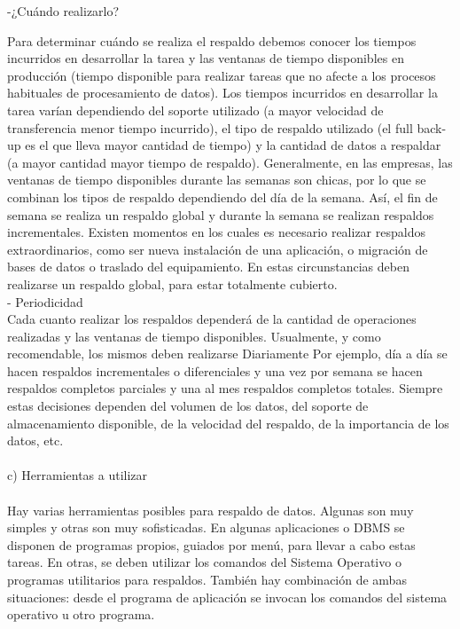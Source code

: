 \documentclass[12pt,letterpaper]{article}
\begin{document}
\newpage

-¿Cuándo realizarlo? 

Para determinar cuándo se realiza el respaldo debemos conocer los tiempos incurridos en desarrollar la tarea y las ventanas de tiempo disponibles en producción (tiempo disponible para realizar tareas que no afecte a los procesos habituales de procesamiento de datos). Los tiempos incurridos en desarrollar la tarea varían dependiendo del soporte utilizado (a mayor velocidad de transferencia menor tiempo incurrido), el tipo de respaldo utilizado (el full back-up es el que lleva mayor cantidad de tiempo) y la cantidad de datos a respaldar (a mayor cantidad mayor tiempo de respaldo). 
Generalmente, en las empresas, las ventanas de tiempo disponibles durante las semanas son chicas, por lo que se combinan los tipos de respaldo  dependiendo del día de la semana. Así, el fin de semana se realiza un respaldo global y durante la semana se realizan respaldos incrementales. Existen momentos en los cuales es necesario realizar respaldos extraordinarios, como ser nueva instalación de una aplicación, o migración de bases de datos o traslado del equipamiento. En estas circunstancias deben realizarse un respaldo global, para estar totalmente cubierto. \\

- Periodicidad \\
 
Cada cuanto realizar los respaldos dependerá de la cantidad de operaciones realizadas y las ventanas de tiempo disponibles. Usualmente, y como recomendable, los mismos deben realizarse Diariamente Por ejemplo, día a día se hacen respaldos incrementales o diferenciales y una vez por semana se hacen respaldos completos parciales y una al mes respaldos completos totales. Siempre estas decisiones dependen del volumen de los datos, del soporte de almacenamiento disponible, de la velocidad del respaldo, de la importancia de los datos, etc. \\ \\



c) Herramientas a utilizar  \\ \\
Hay varias herramientas posibles para respaldo de datos. Algunas son muy simples y otras son muy sofisticadas. En algunas aplicaciones o DBMS se disponen de programas propios, guiados por menú, para llevar a cabo estas tareas. En otras, se deben utilizar los comandos del Sistema Operativo o programas utilitarios para respaldos. También hay combinación de ambas situaciones: desde el programa de aplicación se invocan los comandos del sistema operativo u otro programa. \\
 
\end{document}
